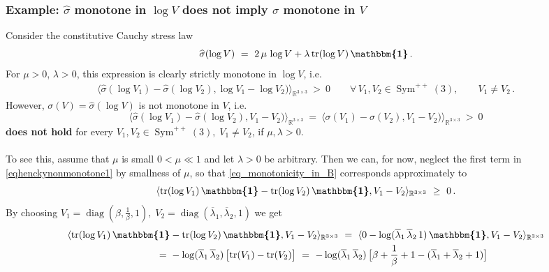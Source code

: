 \documentclass[10pt]{article}
\numberwithin{theoremCounter}{section}
\theoremstyle{plain}
\theoremstyle{definition}
\newcommand{\id}{{\boldsymbol{\mathbbm{1}}}}
\newcommand{\innerproduct}[1]{\langle #1 \rangle}
\newcommand{\iprod}{\innerproduct}
\DeclareMathOperator{\diag}{diag}
\DeclareMathOperator{\Sym}{Sym}
\DeclareMathOperator{\tr}{tr}
\def\tr{\textnormal{tr}}
\numberwithin{equation}{section}
\begin{document}
\begin{appendix}
\subsubsection{Example: $\widehat \sigma$ monotone in $\log V$ does not imply $\sigma$ monotone in $V$} \label{appendixex2}
%
Consider the constitutive Cauchy stress law \cite{Hencky1928}
	\begin{equation}
	\label{eqhenckynonmonotone1}
	\widehat \sigma(\log V)\ =\ 2\,\mu\,\log V + \lambda\,\tr(\log V)\, \id \, .
	\end{equation}
For $\mu>0$, $\lambda>0$, this  expression is clearly strictly monotone in $\log V$, i.e.
	\begin{align}
	\iprod{\widehat \sigma(\log V_1)-\widehat \sigma(\log V_2),\log V_1-\log V_2)}_{\mathbb{R}^{3\times 3}}\ >\ 0 \qquad \forall \, V_1, V_2 \in \Sym^{++}(3), \qquad V_1 \neq V_2 \,.
	\end{align}
However, $\sigma(V) = \widehat \sigma(\log V)$ is not monotone in $V$, i.e.
	\begin{equation}\label{eq_monotonicity_in_B}
	\iprod{\widehat \sigma(\log V_1)-\widehat \sigma(\log V_2),V_1-V_2)}_{\mathbb{R}^{3\times 3}}\ = \ \iprod{\sigma(V_1)-\sigma(V_2),V_1-V_2)}_{\mathbb{R}^{3\times 3}} \ >\ 0
	\end{equation}
\textbf{does not hold} for every $V_1, V_2 \in \Sym^{++}(3), \; V_1 \neq V_2$, if $\mu, \lambda > 0$. \\
\\
To see this, assume that $\mu$ is small $0<\mu\ll1$ and let $\lambda>0$ be arbitrary. Then we can, for now, neglect the first term in \eqref{eqhenckynonmonotone1} by smallness of $\mu$, so that \eqref{eq_monotonicity_in_B} corresponds approximately to 
	\begin{equation}\label{to_show}
	\iprod{\tr(\log V_1)\,\id - \tr(\log V_2)\,\id, V_1-V_2}_{\mathbb{R}^{3\times 3}}\ \geq\ 0\,.
	\end{equation}
By choosing $V_1 = \diag(\beta, \frac{1}{\beta}, 1), \; V_2 = \diag(\overline{\lambda}_1, \overline{\lambda}_2, 1)$ we get
	\begin{equation}
	\label{eq_monotonicity_concr}
	\begin{alignedat}{2}
	\langle\tr(\log V_1)\,\id &- \tr(\log V_2)\,\id, V_1-V_2\rangle_{\mathbb{R}^{3\times 3}}\ =\ \iprod{0 - \log(\overline\lambda_1\,\overline\lambda_2\,1)\,\id, V_1-V_2}_{\mathbb{R}^{3\times 3}} \\
	 \quad =\ &-\log(\overline\lambda_1\,\overline\lambda_2)\,\bigl[\tr(V_1)-\tr(V_2)\bigr]\ =\ -\log(\overline\lambda_1\,\overline\lambda_2)\,\bigl[\beta+\frac 1\beta + 1 - (\overline\lambda_1+\overline\lambda_2+1)\bigr] \\

\end{alignedat}
\end{equation}
\end{appendix}
\end{document}
